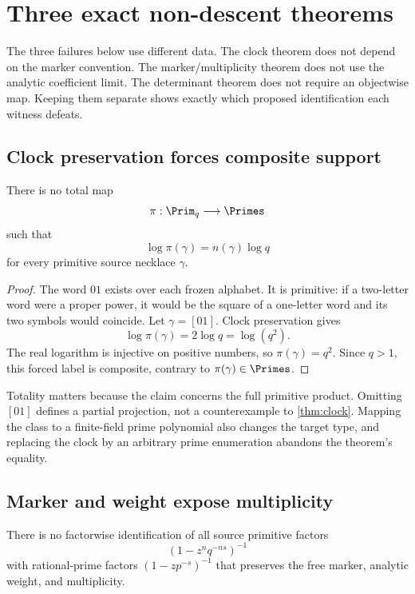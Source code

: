 \section{Three exact non-descent theorems}
\label{sec:non-descent}

The three failures below use different data. The clock theorem does not
depend on the marker convention. The marker/multiplicity theorem does not use
the analytic coefficient limit. The determinant theorem does not require an
objectwise map. Keeping them separate shows exactly which proposed
identification each witness defeats.

\subsection{Clock preservation forces composite support}

\begin{theorem}
\label{thm:clock}
There is no total map
\[
 \pi:\Prim_q\longrightarrow\Primes
\]
such that
\[
 \log\pi(\gamma)=n(\gamma)\log q
\]
for every primitive source necklace $\gamma$.
\end{theorem}

\begin{proof}
The word $01$ exists over each frozen alphabet. It is primitive: if a
two-letter word were a proper power, it would be the square of a one-letter
word and its two symbols would coincide. Let $\gamma=[01]$. Clock
preservation gives
\[
 \log\pi(\gamma)=2\log q=\log(q^2).
\]
The real logarithm is injective on positive numbers, so
$\pi(\gamma)=q^2$. Since $q>1$, this forced label is composite, contrary to
$\pi(\gamma)\in\Primes$.
\end{proof}

Totality matters because the claim concerns the full primitive product.
Omitting $[01]$ defines a partial projection, not a counterexample to
\cref{thm:clock}. Mapping the class to a finite-field prime polynomial also
changes the target type, and replacing the clock by an arbitrary prime
enumeration abandons the theorem's equality.

\subsection{Marker and weight expose multiplicity}

\begin{theorem}
\label{thm:multiplicity}
There is no factorwise identification of all source primitive factors
\[
 \left(1-z^nq^{-ns}\right)^{-1}
\]
with rational-prime factors $(1-zp^{-s})^{-1}$ that preserves the free
marker, analytic weight, and multiplicity.
\end{theorem}

